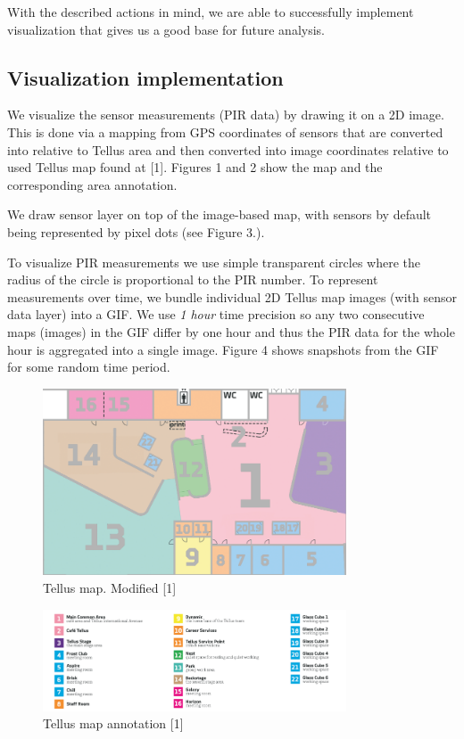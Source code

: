 \documentclass{article}
\begin{document}
With the described actions in mind, we are able to successfully implement visualization that gives
us a good base for future analysis.

\subsection{Visualization implementation}

We visualize the sensor measurements (PIR data) by drawing it on a 2D image. This is done via a
mapping from GPS coordinates of sensors that are converted into relative to Tellus area and then
converted into image coordinates relative to used Tellus map found at [1]. Figures 1 and 2 show the
map and the corresponding area annotation.

We draw sensor layer on top of the image-based map, with sensors by default being represented by
pixel dots (see Figure 3.).

To visualize PIR measurements we use simple transparent circles where the radius of the circle is
proportional to the PIR number. To represent measurements over time, we bundle individual 2D Tellus
map images (with sensor data layer) into a GIF. We use \textit{1 hour} time precision so any two
consecutive maps (images) in the GIF differ by one hour and thus the PIR data for the whole hour is
aggregated into a single image. Figure 4 shows snapshots from the GIF for some random time period.

\begin{figure}[ht!]
  \centering
  \includegraphics[width=90mm]{./tellus_map.png}
  \caption{Tellus map. Modified [1]}
\end{figure}

\begin{figure}[ht!]
  \centering
  \includegraphics[width=90mm]{./tellus_map_annotation.png}
  \caption{Tellus map annotation [1]}
\end{figure}
\end{document}
